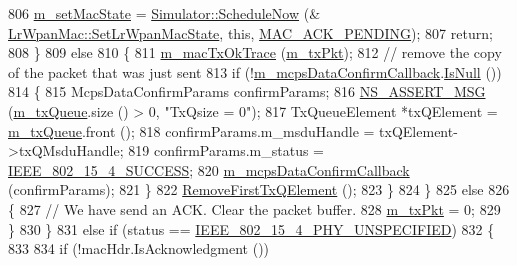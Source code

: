 \begin{DoxyCode}
806               \hyperlink{classns3_1_1LrWpanMac_a764e1cada16e9fc51d9863963d962823}{m\_setMacState} = \hyperlink{classns3_1_1Simulator_a2219ee02c0647adc83d1c918c3256266}{Simulator::ScheduleNow} (&
      \hyperlink{classns3_1_1LrWpanMac_a6749a353feb70bbb851b03477f56dc69}{LrWpanMac::SetLrWpanMacState}, \textcolor{keyword}{this}, \hyperlink{group__lr-wpan_gga02ee7efd682937a8781f5e6101f61884ae46a1e995082569f76cb986500770ab8}{MAC\_ACK\_PENDING});
807               \textcolor{keywordflow}{return};
808             \}
809           \textcolor{keywordflow}{else}
810             \{
811               \hyperlink{classns3_1_1LrWpanMac_a0f0ba6655bd6aba1bac028bd25f4ab7a}{m\_macTxOkTrace} (\hyperlink{classns3_1_1LrWpanMac_aca93e7c7a2128818f2861a48751442ca}{m\_txPkt});
812               \textcolor{comment}{// remove the copy of the packet that was just sent}
813               \textcolor{keywordflow}{if} (!\hyperlink{classns3_1_1LrWpanMac_a05eba7a98d1cbbf86151290069e093e0}{m\_mcpsDataConfirmCallback}.\hyperlink{classns3_1_1Callback_aa8e27826badbf37f84763f36f70d9b54}{IsNull} ())
814                 \{
815                   McpsDataConfirmParams confirmParams;
816                   \hyperlink{assert_8h_aff5ece9066c74e681e74999856f08539}{NS\_ASSERT\_MSG} (\hyperlink{classns3_1_1LrWpanMac_a90ea1fb2b1cec84e8ca2177772a1644d}{m\_txQueue}.size () > 0, \textcolor{stringliteral}{"TxQsize = 0"});
817                   TxQueueElement *txQElement = \hyperlink{classns3_1_1LrWpanMac_a90ea1fb2b1cec84e8ca2177772a1644d}{m\_txQueue}.front ();
818                   confirmParams.m\_msduHandle = txQElement->txQMsduHandle;
819                   confirmParams.m\_status = \hyperlink{group__lr-wpan_gga50d67c8816b2ca8da8df30d045b1b705a9fcca1742a3f5fd112aab55e786a0124}{IEEE\_802\_15\_4\_SUCCESS};
820                   \hyperlink{classns3_1_1LrWpanMac_a05eba7a98d1cbbf86151290069e093e0}{m\_mcpsDataConfirmCallback} (confirmParams);
821                 \}
822               \hyperlink{classns3_1_1LrWpanMac_a359da7ecf2f56e4f62f5e8173bf989dd}{RemoveFirstTxQElement} ();
823             \}
824         \}
825       \textcolor{keywordflow}{else}
826         \{
827           \textcolor{comment}{// We have send an ACK. Clear the packet buffer.}
828           \hyperlink{classns3_1_1LrWpanMac_aca93e7c7a2128818f2861a48751442ca}{m\_txPkt} = 0;
829         \}
830     \}
831   \textcolor{keywordflow}{else} \textcolor{keywordflow}{if} (status == \hyperlink{group__lr-wpan_gga6494269d13d45c511a07b7ccbb1de754a33aedad985a3e4dd7a0c6790a2c677a0}{IEEE\_802\_15\_4\_PHY\_UNSPECIFIED})
832     \{
833 
834       \textcolor{keywordflow}{if} (!macHdr.IsAcknowledgment ())

\end{DoxyCode}
